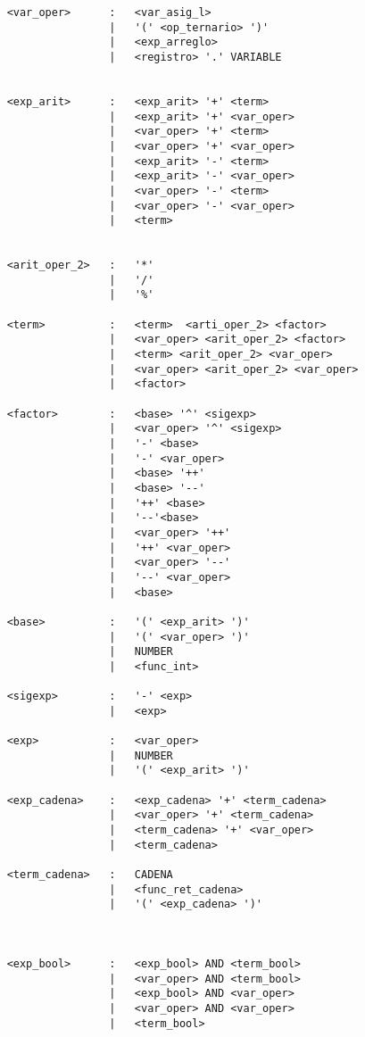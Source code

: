 \begin{verbatim}
    <var_oper>      :   <var_asig_l>
                    |   '(' <op_ternario> ')'
                    |   <exp_arreglo>
                    |   <registro> '.' VARIABLE 

 
    <exp_arit>      :   <exp_arit> '+' <term>
                    |   <exp_arit> '+' <var_oper>
                    |   <var_oper> '+' <term>
                    |   <var_oper> '+' <var_oper>
                    |   <exp_arit> '-' <term>
                    |   <exp_arit> '-' <var_oper>
                    |   <var_oper> '-' <term>
                    |   <var_oper> '-' <var_oper>
                    |   <term>


    <arit_oper_2>   :   '*'
                    |   '/'
                    |   '%'
    
    <term>          :   <term>  <arti_oper_2> <factor>
                    |   <var_oper> <arit_oper_2> <factor>
                    |   <term> <arit_oper_2> <var_oper>
                    |   <var_oper> <arit_oper_2> <var_oper> 
                    |   <factor>

    <factor>        :   <base> '^' <sigexp>
                    |   <var_oper> '^' <sigexp>
                    |   '-' <base>  
                    |   '-' <var_oper>  
                    |   <base> '++'
                    |   <base> '--'
                    |   '++' <base>
                    |   '--'<base>
                    |   <var_oper> '++'
                    |   '++' <var_oper>
                    |   <var_oper> '--'
                    |   '--' <var_oper>
                    |   <base>

    <base>          :   '(' <exp_arit> ')'
                    |   '(' <var_oper> ')'
                    |   NUMBER
                    |   <func_int>

    <sigexp>        :   '-' <exp>
                    |   <exp>

    <exp>           :   <var_oper>
                    |   NUMBER
                    |   '(' <exp_arit> ')'

    <exp_cadena>    :   <exp_cadena> '+' <term_cadena>
                    |   <var_oper> '+' <term_cadena>
                    |   <term_cadena> '+' <var_oper> 
                    |   <term_cadena> 

    <term_cadena>   :   CADENA
                    |   <func_ret_cadena>
                    |   '(' <exp_cadena> ')'



    <exp_bool>      :   <exp_bool> AND <term_bool>
                    |   <var_oper> AND <term_bool>
                    |   <exp_bool> AND <var_oper>
                    |   <var_oper> AND <var_oper>
                    |   <term_bool>


\end{verbatim}
